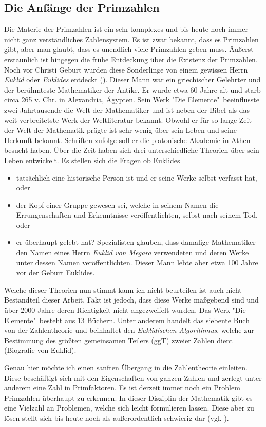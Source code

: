 \documentclass[12pt,a4paper]{article}
\theoremstyle{definition}
\begin{document}
\subsection{Die Anfänge der Primzahlen}\label{Die Anfänge der Primzahlen}
Die Materie der Primzahlen ist ein sehr komplexes und bis heute noch immer nicht ganz verständliches Zahlensystem.
Es ist zwar bekannt, dass es Primzahlen gibt, aber man glaubt, dass es unendlich viele Primzahlen geben muss.
Äußerst erstaunlich ist hingegen die frühe Entdeckung über die Existenz der Primzahlen.
Noch vor Christi Geburt wurden diese Sonderlinge von einem gewissen Herrn \textit{Euklid} oder \textit{Euklides} entdeckt (\cite[22]{Remmert1995}).
Dieser Mann war ein griechischer Gelehrter und der berühmteste Mathematiker der Antike.
Er wurde etwa 60 Jahre alt und starb circa 265 v. Chr. in Alexandria, Ägypten.
Sein Werk "Die Elemente"\ beeinflusste zwei Jahrtausende die Welt der Mathematiker und ist neben der Bibel als das weit verbreitetste Werk der Weltliteratur bekannt.
Obwohl er für so lange Zeit der Welt der Mathematik prägte ist sehr wenig über sein Leben und seine Herkunft bekannt.
Schriften zufolge soll er die platonische Akademie in Athen besucht haben.
Über die Zeit haben sich drei unterschiedliche Theorien über sein Leben entwickelt.
Es stellen sich die Fragen ob Euklides\
\begin{itemize}
\item tatsächlich eine historische Person ist und er seine Werke selbst verfasst hat, oder
\item der Kopf einer Gruppe gewesen sei, welche in seinem Namen die Errungenschaften und Erkenntnisse veröffentlichten, selbst nach seinem Tod, oder
\item er überhaupt gelebt hat?
Spezialisten glauben, dass damalige Mathematiker den Namen eines Herrn \textit{Euklid von Megara} verwendeten und deren Werke unter dessen Namen veröffentlichten.
Dieser Mann lebte aber etwa 100 Jahre vor der Geburt Euklides.
\end{itemize}
Welche dieser Theorien nun stimmt kann ich nicht beurteilen ist auch nicht Bestandteil dieser Arbeit.
Fakt ist jedoch, dass diese Werke maßgebend sind und über 2000 Jahre deren Richtigkeit nicht angezweifelt wurden.
Das Werk "Die Elemente"\ besteht aus 13 Büchern.
Unter anderem handelt das siebente Buch von der Zahlentheorie und beinhaltet den \textit{Euklidischen Algorithmus}, welche zur Bestimmung des größten gemeinsamen Teilers (ggT) zweier Zahlen dient (Biografie von Euklid).

Genau hier möchte ich einen sanften Übergang in die Zahlentheorie einleiten.
Diese beschäftigt sich mit den Eigenschaften von ganzen Zahlen und zerlegt unter anderem eine Zahl in Primfaktoren.
Es ist derzeit immer noch ein Problem Primzahlen überhaupt zu erkennen. In dieser Disziplin der Mathematik gibt es eine Vielzahl an Problemen, welche sich leicht formulieren lassen.
Diese aber zu lösen stellt sich bis heute noch als außerordentlich schwierig dar (vgl. \cite[13]{Pomerance1996}).
\end{document}
